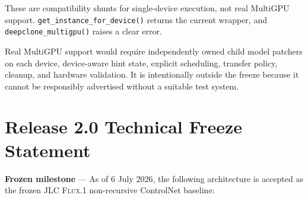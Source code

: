 \documentclass[11pt]{article}
\newcommand{\FluxOne}{\textsc{Flux.1}}
\newcommand{\JLC}{\textsc{JLC}}
\newcommand{\code}[1]{\texttt{#1}}
\newcommand{\freeze}{\textbf{Frozen milestone}}
\begin{document}
These are compatibility shunts for single-device execution, not real MultiGPU support. \code{get\_instance\_for\_device()} returns the current wrapper, and \code{deepclone\_multigpu()} raises a clear error.

Real MultiGPU support would require independently owned child model patchers on each device, device-aware hint state, explicit scheduling, transfer policy, cleanup, and hardware validation. It is intentionally outside the freeze because it cannot be responsibly advertised without a suitable test system.

\section{Release 2.0 Technical Freeze Statement}

\freeze{} --- As of 6 July 2026, the following architecture is accepted as the frozen \JLC{} \FluxOne{} non-recursive ControlNet baseline:
\end{document}
